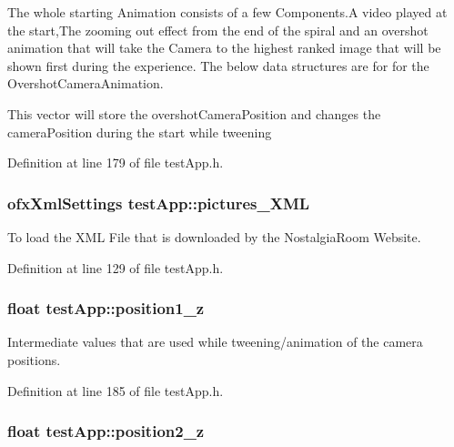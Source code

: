 The whole starting Animation consists of a few Components.\-A video played at the start,The zooming out effect from the end of the spiral and an overshot animation that will take the Camera to the highest ranked image that will be shown first during the experience. The below data structures are for for the Overshot\-Camera\-Animation. 

This vector will store the overshot\-Camera\-Position and changes the camera\-Position during the start while tweening 

Definition at line 179 of file test\-App.\-h.

\hypertarget{classtest_app_a85133f49103cfa002f39d882f7168236}{
\subsubsection[{pictures\-\_\-\-X\-M\-L}]{\setlength{\rightskip}{0pt plus 5cm}ofx\-Xml\-Settings test\-App\-::pictures\-\_\-\-X\-M\-L}}\label{classtest_app_a85133f49103cfa002f39d882f7168236}


To load the X\-M\-L File that is downloaded by the Nostalgia\-Room Website. 



Definition at line 129 of file test\-App.\-h.

\hypertarget{classtest_app_a808376783cdf510335cd1b37026e9bb3}{
\subsubsection[{position1\-\_\-z}]{\setlength{\rightskip}{0pt plus 5cm}float test\-App\-::position1\-\_\-z}}\label{classtest_app_a808376783cdf510335cd1b37026e9bb3}


Intermediate values that are used while tweening/animation of the camera positions. 



Definition at line 185 of file test\-App.\-h.

\hypertarget{classtest_app_a0720011cfaade6388109232ea4927c19}{
\subsubsection[{position2\-\_\-z}]{\setlength{\rightskip}{0pt plus 5cm}float test\-App\-::position2\-\_\-z}}\label{classtest_app_a0720011cfaade6388109232ea4927c19}


